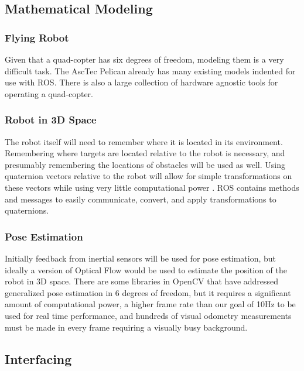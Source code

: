 \documentclass{article}
\begin{document}
	\subsection{Mathematical Modeling}
	
		\subsubsection{Flying Robot}
	
		Given that a quad-copter has six degrees of freedom, modeling them is a very difficult task. The AscTec Pelican already has many existing models indented for use with ROS. There is also a large collection of hardware agnostic tools for operating a quad-copter.
	
		\subsubsection{Robot in 3D Space}
		
		The robot itself will need to remember where it is located in its environment. Remembering where targets are located relative to the robot is necessary, and presumably remembering the locations of obstacles will be used as well. Using quaternion vectors relative to the robot will allow for simple transformations on these vectors while using very little computational power \cite{williams2010combining}. ROS contains methods and messages to easily communicate, convert, and apply transformations to quaternions.
	
		\subsubsection{Pose Estimation}
	
		Initially feedback from inertial sensors will be used for pose estimation, but ideally a version of Optical Flow would be used to estimate the position of the robot in 3D space. There are some libraries in OpenCV that have addressed generalized pose estimation in 6 degrees of freedom, but it requires a significant amount of computational power, a higher frame rate than our goal of 10Hz to be used for real time performance, and hundreds of visual odometry measurements must be made in every frame requiring a visually busy background.

	\subsection{Interfacing}
	
\end{document}
